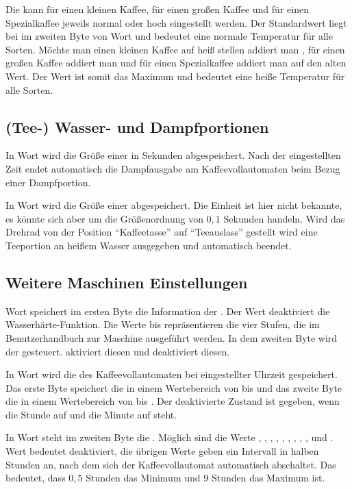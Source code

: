 Die  kann für einen kleinen Kaffee, für einen großen Kaffee und für einen Spezialkaffee jeweils normal oder hoch eingestellt werden.
Der Standardwert liegt bei  im zweiten Byte von Wort  und bedeutet eine normale Temperatur für alle Sorten.
Möchte man einen kleinen Kaffee auf heiß stellen addiert man , für einen großen Kaffee addiert man  und für einen Spezialkaffee addiert man  auf den alten Wert.
Der Wert  ist somit das Maximum und bedeutet eine heiße Temperatur für alle Sorten.

\subsection{(Tee-) Wasser- und Dampfportionen}
In Wort  wird die Größe einer  in Sekunden abgespeichert.
Nach der eingestellten Zeit endet automatisch die Dampfausgabe am Kaffeevollautomaten beim Bezug einer Dampfportion.

In Wort  wird die Größe einer  abgespeichert.
Die Einheit ist hier nicht bekannte, es könnte sich aber um die Größenordnung von $0,1$ Sekunden handeln.
Wird das Drehrad von der Position "`Kaffeetasse"' auf "`Teeauslass"' gestellt wird eine Teeportion an heißem Wasser ausgegeben und automatisch beendet.

\subsection{Weitere Maschinen Einstellungen}
Wort  speichert im ersten Byte die Information der .
Der Wert  deaktiviert die Wasserhärte-Funktion.
Die Werte  bis  repräsentieren die vier Stufen, die im Benutzerhandbuch zur Maschine ausgeführt werden.
In dem zweiten Byte wird der  gesteuert.
 aktiviert diesen und  deaktiviert diesen.

In Wort  wird die  des Kaffeevollautomaten bei eingestellter Uhrzeit gespeichert.
Das erste Byte speichert die  in einem Wertebereich von  bis  und das zweite Byte die  in einem Wertebereich von  bis .
Der deaktivierte Zustand ist gegeben, wenn die Stunde auf  und die Minute auf  steht.

In Wort  steht im zweiten Byte die .
Möglich sind die Werte , , , , , , , , ,  und .
Wert  bedeutet deaktiviert, die übrigen Werte geben ein Intervall in halben Stunden an, nach dem sich der Kaffeevollautomat automatisch abschaltet.
Das bedeutet, dass $0,5$ Stunden das Minimum und $9$ Stunden das Maximum ist.

